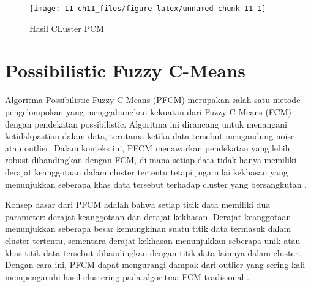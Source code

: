 \documentclass[
  oneside]{book}
\newenvironment{Shaded}{\begin{snugshade}}{\end{snugshade}}
\newcommand{\AttributeTok}[1]{\textcolor[rgb]{0.13,0.29,0.53}{#1}}
\newcommand{\ConstantTok}[1]{\textcolor[rgb]{0.56,0.35,0.01}{#1}}
\newcommand{\DecValTok}[1]{\textcolor[rgb]{0.00,0.00,0.81}{#1}}
\newcommand{\FunctionTok}[1]{\textcolor[rgb]{0.13,0.29,0.53}{\textbf{#1}}}
\newcommand{\NormalTok}[1]{#1}
\newcommand{\SpecialCharTok}[1]{\textcolor[rgb]{0.81,0.36,0.00}{\textbf{#1}}}
\newcommand{\StringTok}[1]{\textcolor[rgb]{0.31,0.60,0.02}{#1}}
\begin{document}
\begin{Shaded}
\end{Shaded}

\begin{figure}[h]

{\centering \texttt{[image: 11-ch11\_files/figure-latex/unnamed-chunk-11-1]} 

}

\caption{Hasil CLuster PCM}\label{fig:unnamed-chunk-11}
\end{figure}

\chapter{Possibilistic Fuzzy C-Means}\label{pfcm}

Algoritma Possibilistic Fuzzy C-Means (PFCM) merupakan salah satu metode pengelompokan yang menggabungkan kekuatan dari Fuzzy C-Means (FCM) dengan pendekatan possibilistic. Algoritma ini dirancang untuk menangani ketidakpastian dalam data, terutama ketika data tersebut mengandung noise atau outlier. Dalam konteks ini, PFCM menawarkan pendekatan yang lebih robust dibandingkan dengan FCM, di mana setiap data tidak hanya memiliki derajat keanggotaan dalam cluster tertentu tetapi juga nilai kekhasan yang menunjukkan seberapa khas data tersebut terhadap cluster yang bersangkutan \citep{Grover2014} \citep{Suganya2012}.

Konsep dasar dari PFCM adalah bahwa setiap titik data memiliki dua parameter: derajat keanggotaan dan derajat kekhasan. Derajat keanggotaan menunjukkan seberapa besar kemungkinan suatu titik data termasuk dalam cluster tertentu, sementara derajat kekhasan menunjukkan seberapa unik atau khas titik data tersebut dibandingkan dengan titik data lainnya dalam cluster. Dengan cara ini, PFCM dapat mengurangi dampak dari outlier yang sering kali mempengaruhi hasil clustering pada algoritma FCM tradisional \citep{Kusumadewi2006} \citep{Chaudhuri2015}.
\end{document}
